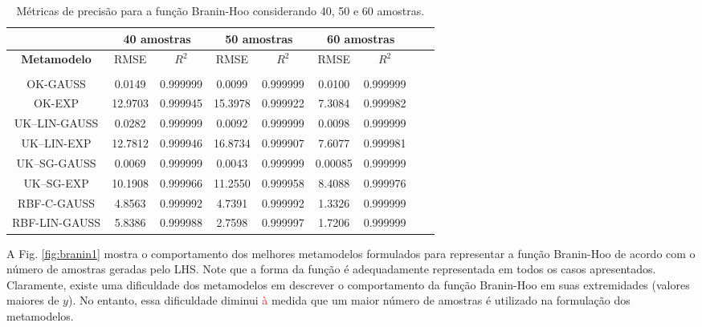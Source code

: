 \begin{table}[H]
	\centering
	\caption{Métricas de precisão para a função Branin-Hoo considerando 40, 50 e 60 amostras.} \label{tab:4} 
	\begin{tabular}{c c c c c c c c c}
		\toprule
		& \multicolumn{2}{c}{\bf 40 amostras} & \multicolumn{2}{c}{\bf 50 amostras} & \multicolumn{2}{c}{\bf 60 amostras} \\ \midrule
		{\bf Metamodelo} & RMSE & {\bf $R^{2}$} & RMSE & {\bf $R^{2}$} & RMSE & {\bf $R^{2}$} \\
		\hline \\
		{OK-GAUSS} & 0.0149 & 0.999999  & 0.0099 & 0.999999 & 0.0100 & 0.999999 \\[4pt]
		OK-EXP & 12.9703 &	0.999945 & 15.3978 & 0.999922 & 7.3084 & 0.999982  \\[4pt]                   
		UK–LIN-GAUSS & 0.0282 &	0.999999 & 0.0092 &	0.999999 & 0.0098 & 0.999999  \\[4pt]
		UK–LIN-EXP & 12.7812 &	0.999946 & 16.8734 & 0.999907 & 7.6077	& 0.999981  \\[4pt]
		UK–SG-GAUSS & 0.0069 & 0.999999 & 0.0043 &	0.999999 & 0.00085 & 0.999999 \\[4pt]
		UK–SG-EXP & 10.1908	& 0.999966 & 11.2550 & 0.999958 & 8.4088 & 0.999976  \\[4pt]
		RBF-C-GAUSS & 4.8563 & 0.999992 & 4.7391 & 0.999992  & 1.3326 & 0.999999 \\[4pt]
		RBF-LIN-GAUSS & 5.8386 & 0.999988 & 2.7598 & 0.999997 & 1.7206 & 0.999999  \\[4pt] \bottomrule
		
	\end{tabular}
	
\end{table}

A Fig. \ref{fig:branin1} mostra o comportamento dos melhores metamodelos formulados para representar a função Branin-Hoo de acordo com o número de amostras geradas pelo LHS. Note que a forma da função é adequadamente representada em todos os casos apresentados. Claramente, existe uma dificuldade dos metamodelos em descrever o comportamento da função Branin-Hoo em suas extremidades (valores maiores de $y$). No entanto, essa dificuldade diminui \textcolor{red}{à} medida que um maior número de amostras é utilizado na formulação dos metamodelos.


